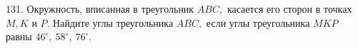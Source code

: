 131. Окружность, вписанная в треугольник $ABC,$ касается его сторон в точках $M, K$ и $P.$ Найдите углы треугольника $ABC,$ если углы треугольника $MKP$ равны $46^\circ,\ 58^\circ,\ 76^\circ.$\\
